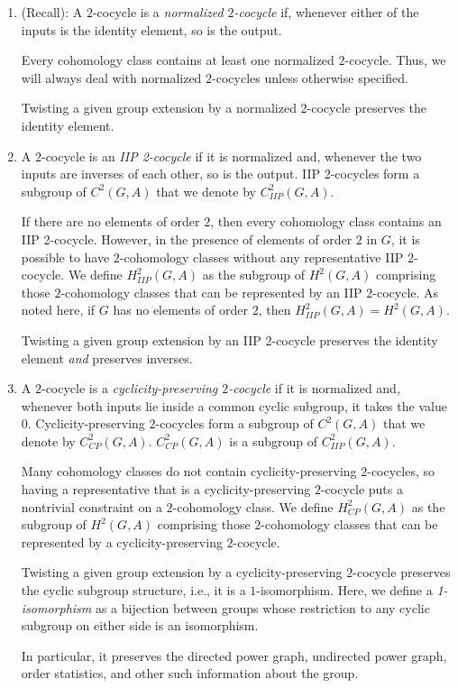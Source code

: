 \documentclass[10pt]{amsart}
\begin{document}
\begin{enumerate}
\item (Recall): A $2$-cocycle is a {\em normalized $2$-cocycle} if,
  whenever either of the inputs is the identity element, so is the
  output.

  Every cohomology class contains at least one normalized
  $2$-cocycle. Thus, we will always deal with normalized $2$-cocycles
  unless otherwise specified.

  Twisting a given group extension by a normalized 2-cocycle preserves
  the identity element.

\item A $2$-cocycle is an {\em IIP 2-cocycle} if it is normalized and,
  whenever the two inputs are inverses of each other, so is the
  output. IIP 2-cocycles form a subgroup of $C^2(G,A)$ that we denote
  by $C^2_{IIP}(G,A)$.

  If there are no elements of order $2$, then every cohomology class
  contains an IIP 2-cocycle. However, in the presence of elements of
  order $2$ in $G$, it is possible to have $2$-cohomology classes
  without any representative IIP 2-cocycle. We define $H^2_{IIP}(G,A)$
  as the subgroup of $H^2(G,A)$ comprising those $2$-cohomology
  classes that can be represented by an IIP $2$-cocycle. As noted
  here, if $G$ has no elements of order $2$, then $H^2_{IIP}(G,A) =
  H^2(G,A)$.

  Twisting a given group extension by an IIP 2-cocycle preserves the
  identity element {\em and} preserves inverses.
\item A $2$-cocycle is a {\em cyclicity-preserving $2$-cocycle} if it
  is normalized and, whenever both inputs lie inside a common cyclic
  subgroup, it takes the value $0$. Cyclicity-preserving $2$-cocycles
  form a subgroup of $C^2(G,A)$ that we denote by
  $C^2_{CP}(G,A)$. $C^2_{CP}(G,A)$ is a subgroup of $C^2_{IIP}(G,A)$.
   
  Many cohomology classes do not contain cyclicity-preserving
  $2$-cocycles, so having a representative that is a
  cyclicity-preserving $2$-cocycle puts a nontrivial constraint on a
  $2$-cohomology class. We define $H^2_{CP}(G,A)$ as the subgroup of
  $H^2(G,A)$ comprising those $2$-cohomology classes that can be
  represented by a cyclicity-preserving $2$-cocycle.

  Twisting a given group extension by a cyclicity-preserving
  $2$-cocycle preserves the cyclic subgroup structure, i.e., it is a
  $1$-isomorphism. Here, we define a {\em 1-isomorphism} as a
  bijection between groups whose restriction to any cyclic subgroup on
  either side is an isomorphism.

  In particular, it preserves the directed power graph, undirected
  power graph, order statistics, and other such information about the
  group.
\end{enumerate}
\end{document}
